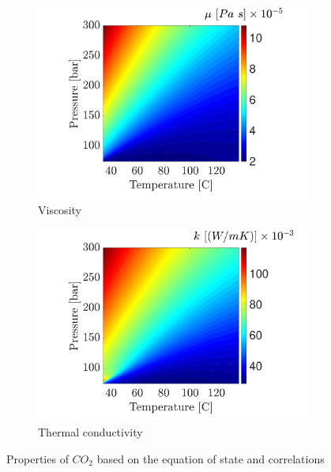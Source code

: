 \documentclass[../Article_Model_Parameters.tex]{subfiles}
\begin{document}
\begin{figure}[H]
\begin{subfigure}[b]{0.32\textwidth}
			\includegraphics[trim = 3.5cm 0cm 1.5cm 0cm,clip,width=\textwidth]{Figures/MU.pdf}
			\caption{Viscosity}
			\label{fig: SFE_Properties_Viscosity}
		\end{subfigure}
		\hfill
		\begin{subfigure}[b]{0.32\textwidth}
			\centering
			\includegraphics[trim = 3.5cm 0cm 1.5cm 0cm,clip,width=\textwidth]{Figures/KT.pdf}	
			\caption{Thermal conductivity}
			\label{fig: SFE_Properties_Thermal}
		\end{subfigure}
		\caption{Properties of $CO_2$ based on the equation of state and correlations}
		\label{fig: SFE_Properties}
	\end{figure}    
	
	
\end{document}
